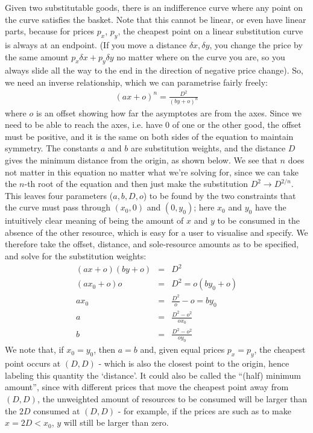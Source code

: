 \documentclass[12pt]{book}
\begin{document}
Given two substitutable goods, there is an indifference curve where
any point on the curve satisfies the basket. Note that this cannot be
linear, or even have linear parts, because for prices $p_x$, $p_y$,
the cheapest point on a linear substitution curve is always at an
endpoint. (If you move a distance $\delta x, \delta y$, you change the
price by the same amount $p_x\delta x + p_y \delta y$ no matter where
on the curve you are, so you always slide all the way to the end in
the direction of negative price change). So, we need an inverse
relationship, which we can parametrise fairly freely:
\begin{eqnarray}
(ax + o)^n = \frac{D^2}{(by +o)^n}
\end{eqnarray}
where $o$ is an offset showing how far the asymptotes are from the
axes. Since we need to be able to reach the axes, i.e. have 0 of one
or the other good, the offset must be positive, and it is the same on
both sides of the equation to maintain symmetry. The constants $a$ and
$b$ are substitution weights, and the distance $D$ gives the minimum
distance from the origin, as shown below. We see that $n$ does not
matter in this equation no matter what we're solving for, since we can take the
$n$-th root of the equation and then just make the substitution
$D^2\to D^{2/n}$. This leaves four parameters ($a,b,D,o$) to be found
by the two constraints that the curve must pass through $(x_0,0)$ and
$(0, y_0)$; here $x_0$ and $y_0$ have the intuitively clear meaning of
being the amount of $x$ and $y$ to be consumed in the absence of the
other resource, which is easy for a user to visualise and specify.
We therefore take the offset, distance, and sole-resource amounts as
to be specified, and solve for the substitution weights:
\begin{eqnarray*}
(ax + o)(by + o) &=& D^2\\
(ax_0 + o)o &=& D^2 = o(by_0 + o)\\
ax_0 &=& \frac{D^2}{o} - o = by_0\\
a &=& \frac{D^2 - o^2}{ox_0}\\
b &=& \frac{D^2 - o^2}{oy_0}
\end{eqnarray*}
We note that, if $x_0=y_0$, then $a=b$ and, given equal prices
$p_x=p_y$, the cheapest point occurs at $(D, D)$ - which is also the
closest point to the origin, hence labeling this quantity the
`distance'. It could also be called the ``(half) minimum amount'', since with
different prices that move the cheapest point away from $(D, D)$, the
unweighted amount of resources to be consumed will be larger than the
$2D$ consumed at $(D, D)$ - for example, if the prices are such as to
make $x=2D<x_0$, $y$ will still be larger than zero.
\end{document}
